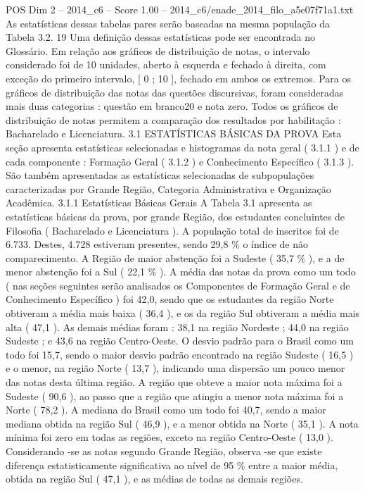 \begin{textsample}{POS Dim 2 – 2014\_c6 – Score 1.00 – 2014\_c6/enade\_2014\_filo\_a5e07f71a1.txt}
As estatísticas dessas tabelas pares serão baseadas na mesma população da Tabela 3.2. 19 Uma definição dessas estatísticas pode ser encontrada no Glossário.
Em relação aos gráficos de distribuição de notas, o intervalo considerado foi de 10 unidades, aberto à esquerda e fechado à direita, com exceção do primeiro intervalo, [ 0 ; 10 ], fechado em ambos os extremos.
Para os gráficos de distribuição das notas das questões discursivas, foram consideradas mais duas categorias : questão em branco20 e nota zero.
Todos os gráficos de distribuição de notas permitem a comparação dos resultados por habilitação : Bacharelado e Licenciatura. 3.1 ESTATÍSTICAS BÁSICAS DA PROVA Esta seção apresenta estatísticas selecionadas e histogramas da nota geral ( 3.1.1 ) e de cada componente : Formação Geral ( 3.1.2 ) e Conhecimento Específico ( 3.1.3 ).
São também apresentadas as estatísticas selecionadas de subpopulações caracterizadas por Grande Região, Categoria Administrativa e Organização Acadêmica. 3.1.1 Estatísticas Básicas Gerais A Tabela 3.1 apresenta as estatísticas básicas da prova, por grande Região, dos estudantes concluintes de Filosofia ( Bacharelado e Licenciatura ).
A população total de inscritos foi de 6.733.
Destes, 4.728 estiveram presentes, sendo 29,8 \% o índice de não comparecimento.
A Região de maior abstenção foi a Sudeste ( 35,7 \% ), e a de menor abstenção foi a Sul ( 22,1 \% ).
A média das notas da prova como um todo ( nas seções seguintes serão analisados os Componentes de Formação Geral e de Conhecimento Específico ) foi 42,0, sendo que os estudantes da região Norte obtiveram a média mais baixa ( 36,4 ), e os da região Sul obtiveram a média mais alta ( 47,1 ).
As demais médias foram : 38,1 na região Nordeste ; 44,0 na região Sudeste ; e 43,6 na região Centro-Oeste.
O desvio padrão para o Brasil como um todo foi 15,7, sendo o maior desvio padrão encontrado na região Sudeste ( 16,5 ) e o menor, na região Norte ( 13,7 ), indicando uma dispersão um pouco menor das notas desta última região.
A região que obteve a maior nota máxima foi a Sudeste ( 90,6 ), ao passo que a região que atingiu a menor nota máxima foi a Norte ( 78,2 ).
A mediana do Brasil como um todo foi 40,7, sendo a maior mediana obtida na região Sul ( 46,9 ), e a menor obtida na Norte ( 35,1 ).
A nota mínima foi zero em todas as regiões, exceto na região Centro-Oeste ( 13,0 ).
Considerando -se as notas segundo Grande Região, observa -se que existe diferença estatisticamente significativa ao nível de 95 \% entre a maior média, obtida na região Sul ( 47,1 ), e as médias de todas as demais regiões.

\end{textsample}

